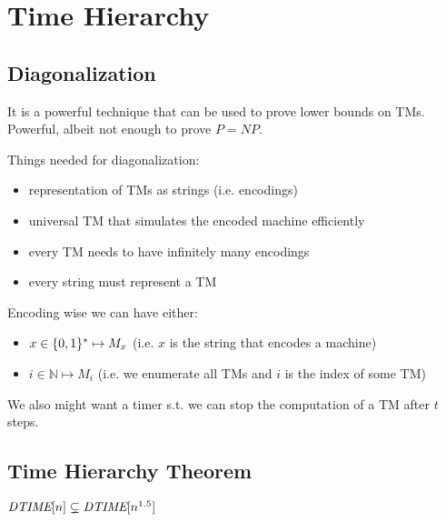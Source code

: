 \section{Time Hierarchy}\label{sec:time_hierarchy}

\subsection{Diagonalization}\label{subsec:diagonalization}
    It is a powerful technique that can be used to prove lower bounds on TMs.
    Powerful, albeit not enough to prove $P = NP$.

    Things needed for diagonalization:
    \begin{itemize}
        \item representation of TMs as strings (i.e. encodings)
        \item universal TM that simulates the encoded machine efficiently
        \item every TM needs to have infinitely many encodings
        \item every string must represent a TM
    \end{itemize}

    Encoding wise we can have either:
    \begin{itemize}
        \item $x \in \{ 0,1 \}^* \mapsto M_x$ (i.e. $x$ is the string that encodes a machine)
        \item $i \in \mathbb{N} \mapsto M_i$ (i.e. we enumerate all TMs and $i$ is the index of some TM)
    \end{itemize}

    We also might want a timer s.t. we can stop the computation of a TM after $t$ steps.

    \begin{center}
    \end{center}


\subsection{Time Hierarchy Theorem}

    \begin{theorem}\label{thm:time_hierarchy_specific}
        $ \textit{DTIME}[n] \subsetneq \textit{DTIME}[n^{1.5}] $
    \end{theorem}

